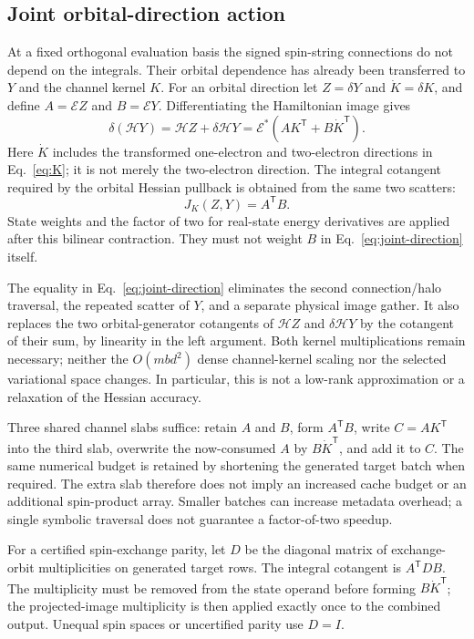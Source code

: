\documentclass[11pt,a4paper]{article}
\newcommand{\Tr}{^{\mathsf T}}
\newcommand{\Ha}{\mathcal H}
\newcommand{\Ea}{\mathcal E}
\begin{document}
\subsection{Joint orbital-direction action}
\label{sec:joint-direction}

At a fixed orthogonal evaluation basis the signed spin-string connections
do not depend on the integrals. Their orbital dependence has already been
transferred to $Y$ and the channel kernel $K$. For an orbital direction let
$Z=\delta Y$ and $\dot K=\delta K$, and define $A=\Ea Z$ and $B=\Ea Y$.
Differentiating the Hamiltonian image gives
\begin{equation}\label{eq:joint-direction}
 \delta(\Ha Y)=\Ha Z+\delta\Ha Y
 =\Ea^*\left(AK\Tr+B\dot K\Tr\right).
\end{equation}
Here $\dot K$ includes the transformed one-electron and two-electron
directions in Eq.~\eqref{eq:K}; it is not merely the two-electron direction.
The integral cotangent required by the orbital Hessian pullback is obtained
from the same two scatters:
\begin{equation}
 J_K(Z,Y)=A\Tr B.
 \label{eq:joint-direction-adjoint}
\end{equation}
State weights and the factor of two for real-state energy derivatives are
applied after this bilinear contraction. They must not weight $B$ in
Eq.~\eqref{eq:joint-direction} itself.

The equality in Eq.~\eqref{eq:joint-direction} eliminates the second
connection/halo traversal, the repeated scatter of $Y$, and a separate
physical image gather. It also replaces the two orbital-generator
cotangents of $\Ha Z$ and $\delta\Ha Y$ by the cotangent of their sum,
by linearity in the left argument. Both kernel multiplications remain
necessary; neither the $O(mbd^2)$ dense channel-kernel scaling nor the
selected variational space changes. In particular, this is not a
low-rank approximation or a relaxation of the Hessian accuracy.

Three shared channel slabs suffice: retain $A$ and $B$, form $A\Tr B$,
write $C=AK\Tr$ into the third slab, overwrite the now-consumed $A$ by
$B\dot K\Tr$, and add it to $C$. The same numerical budget is retained
by shortening the generated target batch when required. The extra slab
therefore does not imply an increased cache budget or an additional
spin-product array. Smaller batches can increase metadata overhead; a
single symbolic traversal does not guarantee a factor-of-two speedup.

For a certified spin-exchange parity, let $D$ be the diagonal matrix of
exchange-orbit multiplicities on generated target rows. The integral
cotangent is $A\Tr DB$. The multiplicity must be removed from the state
operand before forming $B\dot K\Tr$; the projected-image multiplicity is
then applied exactly once to the combined output. Unequal spin spaces
or uncertified parity use $D=I$.
\end{document}
